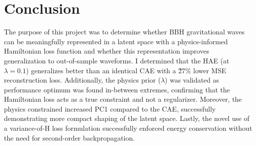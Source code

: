 \documentclass[conference]{IEEEtran}
\begin{document}

\section{Conclusion}
The purpose of this project was to determine whether BBH gravitational waves can be meaningfully represented in a latent space with a physics-informed Hamiltonian loss function and whether this representation improves generalization to out-of-sample waveforms. I determined that the HAE (at $\lambda=0.1$) generalizes better than an identical CAE with a \~27\% lower MSE reconstruction loss. Additionally, the physics prior ($\lambda$) was validated as performance optimum was found in-between extremes, confirming that the Hamiltonian loss acts as a true constraint and not a regularizer. Moreover, the physics constrained increased PC1 compared to the CAE, successfully demonstrating more compact shaping of the latent space. Lastly, the novel use of a variance-of-H loss formulation successfully enforced energy conservation without the need for second-order backpropagation.



\end{document}
